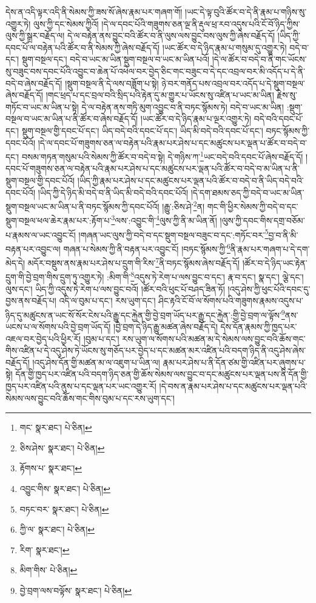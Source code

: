 དེས་ན་འདི་ལྟར་འདི་ནི་སེམས་ཀྱི་ཟས་སོ་ཞེས་རྣམ་པར་གཞག་གོ། །ཡང་དེ་ལྟ་བུའི་ཚོར་བ་དེ་ནི་རྣམ་པ་གཉིས་སུ་འགྱུར་ཏེ། ལུས་ཀྱི་དང་སེམས་ཀྱིའོ། །དེ་ལ་དབང་པོའི་གཟུགས་ཅན་ལྔ་ནི་རྡུལ་ཕྲ་རབ་འདུས་པའི་ངོ་བོ་ཉིད་ཀྱིས་ལུས་ཀྱི་སྒྲར་བརྗོད་ལ། དེ་ལ་བརྟེན་ནས་བྱུང་བའི་ཚོར་བ་ནི་ལུས་ལས་བྱུང་བས་ལུས་ཀྱི་ཞེས་བརྗོད་དོ། །ཡིད་ཀྱི་དབང་པོ་ལ་བརྟེན་པའི་ཚོར་བ་ནི་སེམས་ཀྱི་ཞེས་བརྗོད་དོ། །ཡང་ཚོར་བ་དེ་ཉིད་རྣམ་པ་གསུམ་དུ་འགྱུར་ཏེ། བདེ་བ་དང་། སྡུག་བསྔལ་དང་། བདེ་བ་ཡང་མ་ཡིན་སྡུག་བསྔལ་བ་ཡང་མ་ཡིན་པའོ། །དེ་ལ་ཚོར་བ་བདེ་བ་ནི་གང་ཡོངས་སུ་བཟུང་བས་དབང་པོའི་འབྱུང་བ་ཆེན་པོ་འཕེལ་བར་བྱེད་ཅིང་གང་བཟུང་བ་དེ་དང་འབྲལ་བར་མི་འདོད་པ་དེ་ནི་བདེ་བ་ཞེས་བརྗོད་དོ། །སྡུག་བསྔལ་ནི་དེ་ལས་བཟློག་པ་སྟེ། ཉེ་བར་གནོད་པས་འབྲལ་བར་འདོད་པ་དེ་སྡུག་བསྔལ་ཞེས་བརྗོད་དོ། །གང་ཕྲད་པ་དང་བྲལ་བའི་སྲིད་པའི་རྟེན་དུ་མ་གྱུར་པ་ཡོངས་སུ་འཛིན་པ་ཡང་མ་ཡིན། རྗེས་སུ་གཏོང་བ་ཡང་མ་ཡིན་པ་སྟེ། དེ་ལ་བརྟེན་ནས་གཏི་མུག་འབྱུང་བ་ནི་བཏང་སྙོམས་ཏེ། བདེ་བ་ཡང་མ་ཡིན། :སྡུག་བསྔལ་བ་ཡང་མ་ཡིན་པ་ནི་ཚོར་བ་ཞེས་བརྗོད་དོ། །ཡང་ཚོར་བ་དེ་ཉིད་རྣམ་པ་ལྔར་འགྱུར་ཏེ། བདེ་བའི་དབང་པོ་དང་། སྡུག་བསྔལ་གྱི་དབང་པོ་དང་། ཡིད་བདེ་བའི་དབང་པོ་དང་། ཡིད་མི་བདེ་བའི་དབང་པོ་དང་། བཏང་སྙོམས་ཀྱི་དབང་པོའོ། །དེ་ལ་དབང་པོ་གཟུགས་ཅན་ལ་བརྟེན་པའི་རྣམ་པར་ཤེས་པ་དང་མཚུངས་པར་ལྡན་པ་ཚོར་བ་བདེ་བ་དང་། བསམ་གཏན་གསུམ་པའི་སེམས་ཀྱི་ཚོར་བ་བདེ་བ་སྟེ། དེ་གཉིས་ཀ་\footnote{གང་  སྣར་ཐང་།  པེ་ཅིན། }ཡང་བདེ་བའི་དབང་པོ་ཞེས་བརྗོད་དོ། །དབང་པོ་གཟུགས་ཅན་ལ་བརྟེན་པའི་རྣམ་པར་ཤེས་པ་དང་མཚུངས་པར་ལྡན་པའི་ཚོར་བ་བདེ་བ་མ་ཡིན་པ་ནི་སྡུག་བསྔལ་གྱི་དབང་པོའོ། །ཡིད་ཀྱི་རྣམ་པར་ཤེས་པ་དང་མཚུངས་པར་ལྡན་པའི་ཚོར་བ་བདེ་བ་ནི་ཡིད་བདེ་བའི་དབང་པོའོ། །ཡིད་ཀྱི་དེ་ཉིད་མི་བདེ་བ་ནི་ཡིད་མི་བདེ་བའི་དབང་པོའོ། །དེ་དག་ཐམས་ཅད་ཀྱི་བདེ་བ་ཡང་མ་ཡིན་སྡུག་བསྔལ་ཡང་མ་ཡིན་པ་ནི་བཏང་སྙོམས་ཀྱི་དབང་པོའོ། །རྒྱུ་:ཅིས་ཤེ་\footnote{ཅིས་ཤེས་  སྣར་ཐང་།  པེ་ཅིན། }ན། གང་གི་ཕྱིར་སེམས་ཀྱི་བདེ་བ་དང་སྡུག་བསྔལ་ཕལ་ཆེར་རྣམ་པར་:རྟོག་པ་\footnote{རྟོགས་པ་  སྣར་ཐང་། }ལས་:འབྱུང་གི་\footnote{འབྱུང་གིས་  སྣར་ཐང་།  པེ་ཅིན། }ལུས་ཀྱི་ནི་མ་ཡིན་ནོ། །ལུས་ཀྱི་དབང་གིས་དགྲ་བཅོམ་པ་རྣམས་ལ་ཡང་འབྱུང་ངོ། །གཞན་ཡང་ལུས་ཀྱི་བདེ་བ་དང་སྡུག་བསྔལ་བཟུང་བ་དང་:གཏོང་བར་\footnote{བཏང་བར་  སྣར་ཐང་།  པེ་ཅིན། }བྱ་བ་ནི་མི་བརྟན་པར་འབྱུང་ལ། གཞན་པ་སེམས་ཀྱི་ནི་བརྟན་པར་འབྱུང་ངོ། །བཏང་སྙོམས་ཀྱི་\footnote{ཀྱི་ལ་  སྣར་ཐང་།  པེ་ཅིན། }ནི་རྣམ་པར་གཞག་པ་དེ་དག་མེད་དེ། མདོར་བསྡུས་ནས་རྣམ་པར་ཤེས་པ་དྲུག་གི་རིས་\footnote{རིག་  སྣར་ཐང་། }ནི་བཏང་སྙོམས་ཞེས་བརྗོད་དོ། །ཚོར་བ་དེ་ཉིད་ཡང་རྟེན་དྲུག་གི་བྱེ་བྲག་གིས་དྲུག་ཏུ་འགྱུར་ཏེ། :མིག་གི་\footnote{མིག་གིས་  པེ་ཅིན། }འདུས་ཏེ་རེག་པ་ལས་བྱུང་བ་དང་། རྣ་བ་དང་། སྣ་དང་། ལྕེ་དང་། ལུས་དང་། ཡིད་ཀྱི་འདུས་ཏེ་རེག་པ་ལས་བྱུང་བའོ། །ཚོར་བའི་ཕུང་པོ་བཤད་ཟིན་ཏོ། །འདུ་ཤེས་ཀྱི་ཕུང་པོའི་དབང་དུ་བྱས་ནས་བརྗོད་པ། འདི་ལ་བུམ་པ་དང་། རས་ཡུག་དང་། ཤིང་རྟའི་ངོ་བོ་ལ་སོགས་པའི་གཟུགས་རྣམས་འདུས་པ་ཉིད་དུ་མཚུངས་ན་ཡང་སོ་སོར་ངེས་པའི་རྒྱུ་དང་རྐྱེན་གྱི་བྱེ་བྲག་ཡོད་པར་རྒྱུ་དང་རྐྱེན་:གྱི་བྱེ་བྲག་ལ་ལྟོས་\footnote{བྱེ་བྲག་ལས་བལྟོས་  སྣར་ཐང་།  པེ་ཅིན། }ནས་ཡངས་པ་ལ་སོགས་པའི་བྱེ་བྲག་ཡོད་དོ། །བྱེ་བྲག་དེ་ཉིད་རྒྱུ་མཚན་ཞེས་བརྗོད་དེ། དེས་དོན་རྣམས་ཀྱི་ཁྱད་པར་འཇལ་བར་བྱེད་པའི་ཕྱིར་རོ། །བུམ་པ་དང་། རས་ཡུག་ལ་སོགས་པའི་མཚན་མ་དེ་སེམས་ལས་བྱུང་བའི་ཆོས་གང་གིས་འཛིན་པ་དེ་འདུ་ཤེས་ཏེ་ཡོངས་སུ་གཅོད་པར་བྱེད་པ་དང་མཚན་མར་འཛིན་པའི་བདག་ཉིད་ནི་འདུ་ཤེས་ཞེས་བརྗོད་དོ། །འདུ་ཤེས་དོན་གྱི་མཚན་མ་ལ་འཇུག་པ་ཡིན་ལ། རྣམ་པར་ཤེས་པ་ནི་དོན་ཙམ་གྱི་འཛིན་པར་ཞུགས་པ་སྟེ། དོན་གྱི་ཁྱད་པར་འཛིན་པའི་བདག་ཉིད་ཅན་གྱི་ཆོས་སེམས་ལས་བྱུང་བ་དང་མཚུངས་པར་ལྡན་པས་ནི་དོན་གྱི་ཁྱད་པར་འཛིན་པའི་ནུས་པ་དང་ལྡན་པར་ཡང་འགྱུར་རོ། །དེ་བས་ན་རྣམ་པར་ཤེས་པ་དང་མཚུངས་པར་ལྡན་པའི་སེམས་ལས་བྱུང་བའི་ཆོས་གང་གིས་བུམ་པ་དང་རས་ཡུག་དང་། 